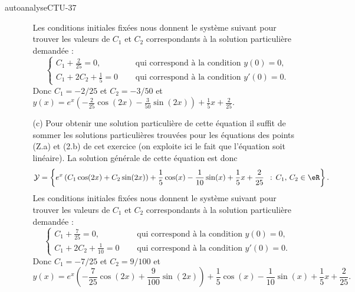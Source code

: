 \begin{corrige}{autoanalyseCTU-37}
\begin{enumerate}
\begin{enumerate}
Les conditions initiales fixées nous donnent le système suivant pour trouver les valeurs de $C_1$ et $C_2$ correspondants à la solution particulière demandée :
\begin{equation*}
  \begin{cases}
    C_1+\frac{2}{25}= 0,  & \quad\text{ qui correspond à la condition }y(0)=0,\\
    C_1+2C_2+\frac{1}{5} = 0 & \quad\text{ qui correspond à la condition }y'(0)=0.
  \end{cases}
\end{equation*}
Donc $C_1= -2/25$ et $C_2 = -3/50$ et $y(x) = e^{x}\left(-\frac{2}{25}\cos(2x) -\frac{3}{50}\sin(2x)\right)+ \frac{1}{5}x+\frac{2}{25}$.
  \item[(c)] Pour obtenir une solution particulière de cette équation il suffit de sommer les solutions particulières trouvées pour les équations des points (Z.a) et (2.b) de cet exercice (on exploite ici le fait que l'équation soit linéaire). La solution générale de cette équation est donc 
 \begin{equation*}
  \mathcal{Y} = \left\{ e^{x}\left(C_1\cos(2x) +C_2\sin(2x)\right)+ \frac{1}{5} \cos(x) -\frac{1}{10}\sin(x)+\frac{1}{5}x +\frac{2}{25} \ \,:\, C_1,\, C_2 \in \eR \right\}.
\end{equation*}
Les conditions initiales fixées nous donnent le système suivant pour trouver les valeurs de $C_1$ et $C_2$ correspondants à la solution particulière demandée :
\begin{equation*}
  \begin{cases}
    C_1+\frac{7}{25}= 0,  & \quad\text{ qui correspond à la condition }y(0)=0,\\
    C_1+2C_2+\frac{1}{10} = 0 & \quad\text{ qui correspond à la condition }y'(0)=0.
  \end{cases}
\end{equation*}
Donc $C_1= -7/25$ et $C_2 = 9/100$ et 
\[y(x) = e^{x}\left(-\frac{7}{25}\cos(2x) +\frac{9}{100}\sin(2x)\right)+ \frac{1}{5} \cos(x) -\frac{1}{10}\sin(x)+ \frac{1}{5}x+\frac{2}{25}.
\]
  \end{enumerate}
  \end{enumerate}

\end{corrige}   
